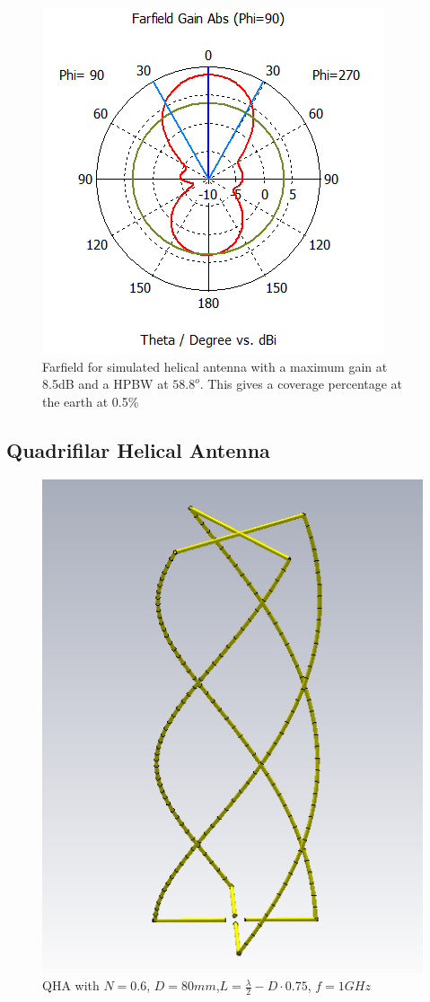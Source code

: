 \begin{figure}[H]
\centering 
\includegraphics[scale = 0.7]{figures/antennas/helical/helical_cst_farfield}
\caption{Farfield for simulated helical antenna with a maximum gain at 8.5dB and a HPBW at $58.8^o$. This gives a coverage percentage at the earth at 0.5\% }
\label{fig:helical_farfield}
\end{figure}

\subsection{Quadrifilar Helical Antenna}

\begin{figure}[H]
\centering 
\includegraphics[scale = 0.7]{figures/antennas/qha/qha_6_1mhz}
\caption{QHA with $N=0.6$, $D=80mm$,$L=\frac{\lambda}{2}-D\cdot 0.75$, $f=1GHz$}
\label{fig:QHA1}
\end{figure}

